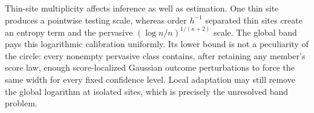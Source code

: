 Thin-site multiplicity affects inference as well as estimation. One thin site produces a pointwise testing scale, whereas order \(h^{-1}\) separated thin sites create an entropy term and the pervasive \((\log n/n)^{1/(\kappa+2)}\) scale. The global band pays this logarithmic calibration uniformly. Its lower bound is not a peculiarity of the circle: every nonempty pervasive class contains, after retaining any member's score law, enough score-localized Gaussian outcome perturbations to force the same width for every fixed confidence level. Local adaptation may still remove the global logarithm at isolated sites, which is precisely the unresolved band problem.